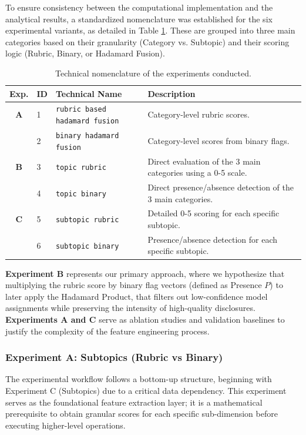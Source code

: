 To ensure consistency between the computational implementation and the analytical results, a standardized nomenclature was established for the six experimental variants, as detailed in Table \ref{tab:experiment_names}. These are grouped into three main categories based on their granularity (Category vs. Subtopic) and their scoring logic (Rubric, Binary, or Hadamard Fusion).

\begin{table}[htbp]
\centering
\caption{Technical nomenclature of the experiments conducted.}
\label{tab:experiment_names}
\begin{tabular}{@{}cllp{5cm}@{}}
\toprule
\textbf{Exp.} & \textbf{ID} & \textbf{Technical Name} & \textbf{Description} \\ \midrule
\textbf{A} & 1 & \texttt{rubric based hadamard fusion} & Category-level rubric scores. \\
           & 2 & \texttt{binary hadamard fusion} & Category-level scores from binary flags. \\ \midrule
\textbf{B} & 3 & \texttt{topic rubric} & Direct evaluation of the 3 main categories using a 0-5 scale. \\
           & 4 & \texttt{topic binary} & Direct presence/absence detection of the 3 main categories. \\ \midrule
\textbf{C} & 5 & \texttt{subtopic rubric} & Detailed 0-5 scoring for each specific subtopic. \\
           & 6 & \texttt{subtopic binary} & Presence/absence detection for each specific subtopic. \\ \bottomrule
\end{tabular}
\end{table}

\newpage

\textbf{Experiment B} represents our primary approach, where we hypothesize that multiplying the rubric score by binary flag vectors (defined as Presence $P$) to later apply the Hadamard Product, that filters out low-confidence model assignments while preserving the intensity of high-quality disclosures.\\
\textbf{Experiments A and C} serve as ablation studies and validation baselines to justify the complexity of the feature engineering process.



        \subsubsection{Experiment A: Subtopics (Rubric vs Binary)}
The experimental workflow follows a bottom-up structure, beginning with Experiment C (Sub\-to\-pics) due to a critical data dependency. This experiment serves as the foundational feature extraction layer; it is a mathematical prerequisite to obtain granular scores for each specific sub-dimension before executing higher-level operations.


